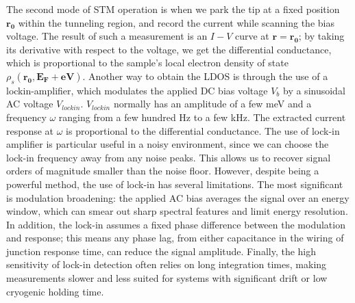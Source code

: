 The second mode of \ac{STM} operation is when we park the tip at a fixed position $\mathbf{r_0}$ within the tunneling region, and record the current while scanning the bias voltage. The result of such a measurement is an $I-V$ curve at $\mathbf{r} = \mathbf{r_0}$; by taking its derivative with respect to the voltage, we get the differential conductance, which is proportional to the sample's local electron density of state $\rho_s(\mathbf{r_0, E_F+eV})$. Another way to obtain the LDOS is through the use of a lockin-amplifier, which modulates the applied DC bias voltage $V_b$ by a sinusoidal AC voltage $V_{lockin}$.  $V_{lockin}$ normally has an amplitude of a few meV and a frequency $\omega$ ranging from a few hundred Hz to a few kHz. The extracted current response at $\omega$ is proportional to the differential conductance. The use of lock-in amplifier is particular useful in a noisy environment, since we can choose the lock-in frequency away from any noise peaks. This allows us to recover signal orders of magnitude smaller than the noise floor. However, despite being a powerful method, the use of lock-in has several limitations. The most significant is modulation broadening: the applied AC bias averages the signal over an energy window, which can smear out sharp spectral features and limit energy resolution. In addition, the lock-in assumes a fixed phase difference between the modulation and response; this means any phase lag, from either capacitance in the wiring of junction response time, can reduce the signal amplitude. Finally, the high sensitivity of lock-in detection often relies on long integration times, making measurements slower and less suited for systems with significant drift or low cryogenic holding time.

